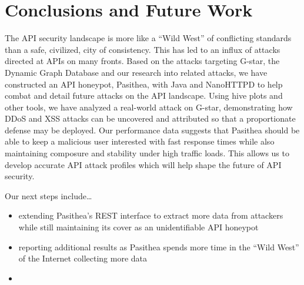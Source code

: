 
\section{Conclusions and Future Work} \label{conclusions}

The API security landscape is more like a ``Wild West'' of conflicting standards than a safe, civilized, city of consistency.
This has led to an influx of attacks directed at APIs on many  fronts. 
Based on the attacks targeting G-star, the Dynamic Graph Database and our research into related attacks, we have constructed an API honeypot, Pasithea, with Java and NanoHTTPD to help combat and detail future attacks on the API landscape. 
Using hive plots and other tools, we have analyzed a real-world attack on G-star, demonstrating how DDoS and XSS attacks can be uncovered and attributed so that a proportionate defense may be deployed.  
Our performance data suggests that Pasithea should be able to keep a malicious user interested with fast response times while also maintaining composure and stability under high traffic loads. 
This allows us to develop accurate API attack profiles which will help shape the future of API security.

Our next steps include\ldots
\begin{itemize}
   \item extending Pasithea’s REST interface to extract more data from attackers while still maintaining its cover as an unidentifiable API honeypot
   \item reporting additional results as Pasithea spends more time in the ``Wild West'' of the Internet collecting more data
   \item 
\end{itemize}
